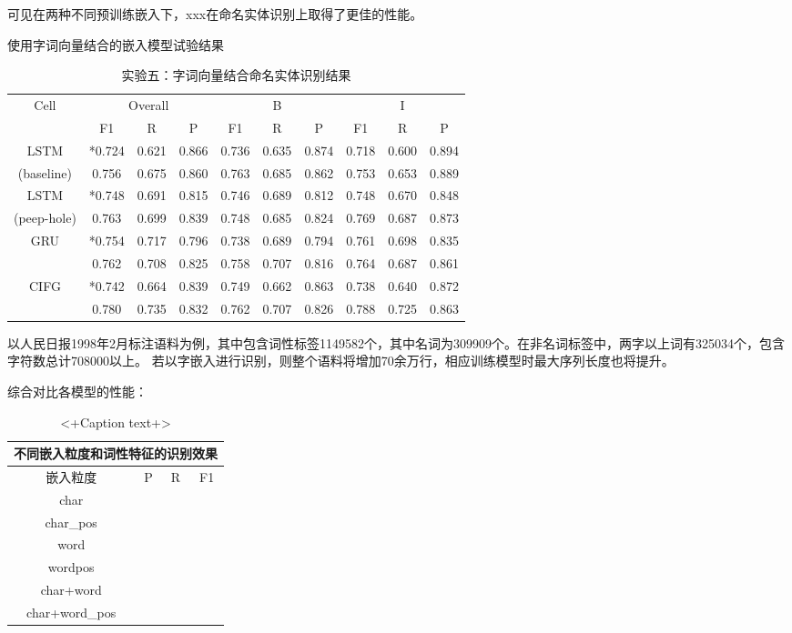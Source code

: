 可见在两种不同预训练嵌入下，xxx在命名实体识别上取得了更佳的性能。

使用字词向量结合的嵌入模型试验结果
\begin{table}[H]
    \centering
    \caption{实验五：字词向量结合命名实体识别结果}
    \begin{tabular}{cccccccccc}
        \toprule
            \multirow{2}{*}{Cell} &\multicolumn{3}{c}{Overall} &\multicolumn{3}{c}{B} &\multicolumn{3}{c}{I}\\
            \cmidrule(lr){2-4} \cmidrule(lr){5-7} \cmidrule(lr){8-10}
            & F1 & R & P & F1 & R & P & F1 & R & P\\
        \midrule
            LSTM & *0.724 & 0.621 & 0.866 & 0.736 & 0.635 & 0.874 & 0.718 & 0.600 & 0.894\\
            (baseline) & 0.756 & 0.675 & 0.860 & 0.763 & 0.685 & 0.862 & 0.753 & 0.653 & 0.889\\
            LSTM & *0.748 & 0.691 & 0.815 & 0.746 & 0.689 & 0.812 & 0.748 & 0.670 & 0.848\\
            (peep-hole) & 0.763 & 0.699 & 0.839 & 0.748 & 0.685 & 0.824 & 0.769 & 0.687 & 0.873\\
            \multirow{2}{2cm}{GRU} & *0.754 & 0.717 & 0.796 & 0.738 & 0.689 & 0.794 & 0.761 & 0.698 & 0.835\\
                                 & 0.762 & 0.708 & 0.825 & 0.758 & 0.707 & 0.816 & 0.764 & 0.687 & 0.861\\
            \multirow{2}{2cm}{CIFG} & *0.742 & 0.664 & 0.839 & 0.749 & 0.662 & 0.863 & 0.738 & 0.640 & 0.872\\
                                  & 0.780 & 0.735 & 0.832 & 0.762 & 0.707 & 0.826 & 0.788 & 0.725 & 0.863\\
        \bottomrule
    \end{tabular}
    \label{tab:tab1}
\end{table}
以人民日报1998年2月标注语料为例，其中包含词性标签1149582个，其中名词为309909个。在非名词标签中，两字以上词有325034个，包含字符数总计708000以上。
若以字嵌入进行识别，则整个语料将增加70余万行，相应训练模型时最大序列长度也将提升。

综合对比各模型的性能：
\begin{table}
    \centering
    \begin{tabular}{cccc}
        \toprule
        \multicolumn{4}{c}{不同嵌入粒度和词性特征的识别效果}\\
        \midrule
        嵌入粒度 & P  & R  & F1\\
        \midrule
        char & & &\\
        char\_pos & & &\\
        word & & &\\
        word{pos} & & &\\
        char+word & & &\\
        char+word\_pos& & &\\
    \end{tabular}
    \caption{<+Caption text+>}
    \label{tab:<+label+>}
\end{table}



